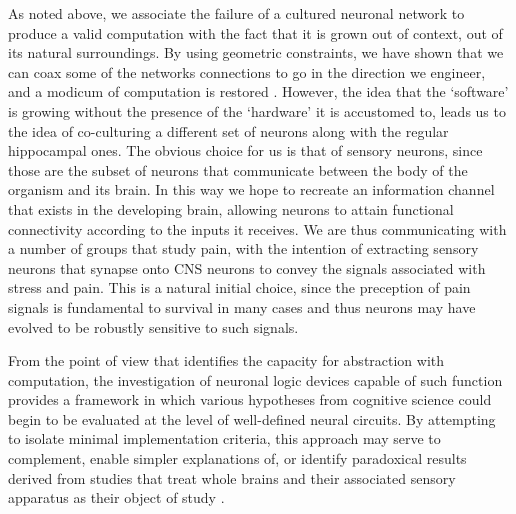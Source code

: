 As noted above, we associate the failure of a cultured neuronal network to produce a valid computation with the fact that it is grown out of context, out of its natural surroundings. By using geometric constraints, we have shown that we can coax some of the networks connections to go in the direction we engineer, and a modicum of computation is restored \cite{Feinerman2008}. However, the idea that the `software' is growing without the presence of the `hardware' it is accustomed to, leads us to the idea of co-culturing a different set of neurons along with the regular hippocampal ones. The obvious choice for us is that of sensory neurons, since those are the subset of neurons that communicate between the body of the organism and its brain. In this way we hope to recreate an information channel that exists in the developing brain, allowing neurons to attain functional connectivity according to the inputs it receives.
We are thus communicating with a number of groups that study pain, with the intention of extracting sensory neurons that synapse onto CNS neurons to convey the signals associated with stress and pain. This is a natural initial choice, since the preception of pain signals is fundamental to survival in many cases and thus neurons may have evolved to be robustly sensitive to such signals.

From the point of view that identifies the capacity for abstraction with
computation, the investigation of neuronal logic devices capable of such
function provides a framework in which various hypotheses from cognitive
science could begin to be evaluated at the level of well-defined neural
circuits. By attempting to isolate minimal implementation criteria, this
approach may serve to complement, enable simpler explanations of, or
identify paradoxical results derived from studies that treat whole
brains and their associated sensory apparatus as their object of study
\cite{McClelland2010,Griffiths2010}.

